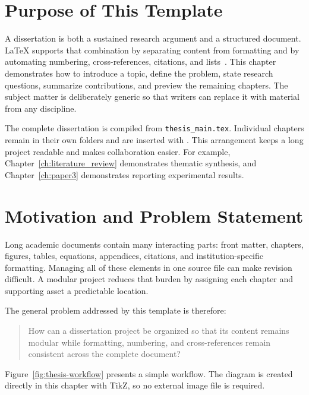\section{Purpose of This Template}

A dissertation is both a sustained research argument and a structured document. LaTeX supports that combination by separating content from formatting and by automating numbering, cross-references, citations, and lists~\cite{lamport1994latex,mittelbach2023latex}. This chapter demonstrates how to introduce a topic, define the problem, state research questions, summarize contributions, and preview the remaining chapters. The subject matter is deliberately generic so that writers can replace it with material from any discipline.

The complete dissertation is compiled from \texttt{thesis\_main.tex}. Individual chapters remain in their own folders and are inserted with \verb||. This arrangement keeps a long project readable and makes collaboration easier. For example, Chapter~\ref{ch:literature_review} demonstrates thematic synthesis, and Chapter~\ref{ch:paper3} demonstrates reporting experimental results.

\section{Motivation and Problem Statement}

Long academic documents contain many interacting parts: front matter, chapters, figures, tables, equations, appendices, citations, and institution-specific formatting. Managing all of these elements in one source file can make revision difficult. A modular project reduces that burden by assigning each chapter and supporting asset a predictable location.

The general problem addressed by this template is therefore:

\begin{quote}
How can a dissertation project be organized so that its content remains modular while formatting, numbering, and cross-references remain consistent across the complete document?
\end{quote}

Figure~\ref{fig:thesis-workflow} presents a simple workflow. The diagram is created directly in this chapter with TikZ, so no external image file is required.

